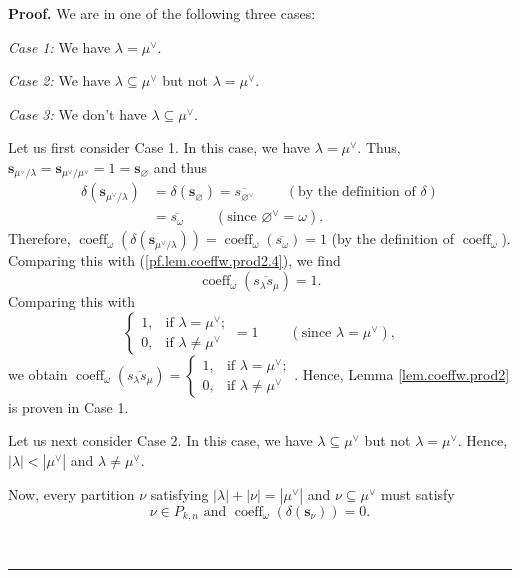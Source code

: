 \documentclass[numbers=enddot,12pt,final,onecolumn,notitlepage]{scrartcl}%
\theoremstyle{definition}
\newenvironment{proof}[1][Proof]{\noindent\textbf{#1.} }{\ \rule{0.5em}{0.5em}}
\begin{document}
\begin{proof}
We are in one of the following three cases:

\textit{Case 1:} We have $\lambda=\mu^{\vee}$.

\textit{Case 2:} We have $\lambda\subseteq\mu^{\vee}$ but not $\lambda
=\mu^{\vee}$.

\textit{Case 3:} We don't have $\lambda\subseteq\mu^{\vee}$.

Let us first consider Case 1. In this case, we have $\lambda=\mu^{\vee}$.
Thus, $\mathbf{s}_{\mu^{\vee}/\lambda}=\mathbf{s}_{\mu^{\vee}/\mu^{\vee}%
}=1=\mathbf{s}_{\varnothing}$ and thus%
\begin{align*}
\delta\left(  \mathbf{s}_{\mu^{\vee}/\lambda}\right)   &  =\delta\left(
\mathbf{s}_{\varnothing}\right)  =\overline{s_{\varnothing^{\vee}}%
}\ \ \ \ \ \ \ \ \ \ \left(  \text{by the definition of }\delta\right) \\
&  =\overline{s_{\omega}}\ \ \ \ \ \ \ \ \ \ \left(  \text{since }%
\varnothing^{\vee}=\omega\right)  .
\end{align*}
Therefore, $\operatorname*{coeff}\nolimits_{\omega}\left(  \delta\left(
\mathbf{s}_{\mu^{\vee}/\lambda}\right)  \right)  =\operatorname*{coeff}%
\nolimits_{\omega}\left(  \overline{s_{\omega}}\right)  =1$ (by the definition
of $\operatorname*{coeff}\nolimits_{\omega}$). Comparing this with
(\ref{pf.lem.coeffw.prod2.4}), we find%
\[
\operatorname*{coeff}\nolimits_{\omega}\left(  \overline{s_{\lambda}s_{\mu}%
}\right)  =1.
\]
Comparing this with%
\[%
\begin{cases}
1, & \text{if }\lambda=\mu^{\vee};\\
0, & \text{if }\lambda\neq\mu^{\vee}%
\end{cases}
=1\ \ \ \ \ \ \ \ \ \ \left(  \text{since }\lambda=\mu^{\vee}\right)  ,
\]
we obtain $\operatorname*{coeff}\nolimits_{\omega}\left(  \overline
{s_{\lambda}s_{\mu}}\right)  =%
\begin{cases}
1, & \text{if }\lambda=\mu^{\vee};\\
0, & \text{if }\lambda\neq\mu^{\vee}%
\end{cases}
$. Hence, Lemma \ref{lem.coeffw.prod2} is proven in Case 1.

Let us next consider Case 2. In this case, we have $\lambda\subseteq\mu^{\vee
}$ but not $\lambda=\mu^{\vee}$. Hence, $\left\vert \lambda\right\vert
<\left\vert \mu^{\vee}\right\vert $ and $\lambda\neq\mu^{\vee}$.

Now, every partition $\nu$ satisfying $\left\vert \lambda\right\vert
+\left\vert \nu\right\vert =\left\vert \mu^{\vee}\right\vert $ and
$\nu\subseteq\mu^{\vee}$ must satisfy%
\begin{equation}
\nu\in P_{k,n}\text{ and }\operatorname*{coeff}\nolimits_{\omega}\left(
\delta\left(  \mathbf{s}_{\nu}\right)  \right)  =0.
\label{pf.lem.coeffw.prod2.c2.1}%
\end{equation}



\end{proof}
\end{document}

